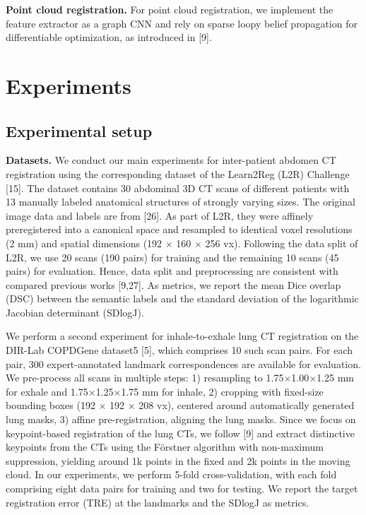 \textbf{Point cloud registration.} For point cloud registration, we implement the feature extractor as a graph CNN and rely on sparse loopy belief propagation for differentiable optimization, as introduced in [9].

\section{Experiments}

\subsection{Experimental setup}

\textbf{Datasets.} We conduct our main experiments for inter-patient abdomen CT registration using the corresponding dataset of the Learn2Reg (L2R) Challenge [15]. The dataset contains 30 abdominal 3D CT scans of different patients with 13 manually labeled anatomical structures of strongly varying sizes. The original image data and labels are from [26]. As part of L2R, they were affinely preregistered into a canonical space and resampled to identical voxel resolutions (2 mm) and spatial dimensions (192 $\times$ 160 $\times$ 256 vx). Following the data split of L2R, we use 20 scans (190 pairs) for training and the remaining 10 scans (45 pairs) for evaluation. Hence, data split and preprocessing are consistent with compared previous works [9,27]. As metrics, we report the mean Dice overlap (DSC) between the semantic labels and the standard deviation of the logarithmic Jacobian determinant (SDlogJ).

We perform a second experiment for inhale-to-exhale lung CT registration on the DIR-Lab COPDGene dataset5 [5], which comprises 10 such scan pairs. For each pair, 300 expert-annotated landmark correspondences are available for evaluation. We pre-process all scans in multiple steps: 1) resampling to 1.75$\times$1.00$\times$1.25 mm for exhale and 1.75$\times$1.25$\times$1.75 mm for inhale, 2) cropping with fixed-size bounding boxes (192 $\times$ 192 $\times$ 208 vx), centered around automatically generated lung masks, 3) affine pre-registration, aligning the lung masks. Since we focus on keypoint-based registration of the lung CTs, we follow [9] and extract distinctive keypoints from the CTs using the Förstner algorithm with non-maximum suppression, yielding around 1k points in the fixed and 2k points in the moving cloud. In our experiments, we perform 5-fold cross-validation, with each fold comprising eight data pairs for training and two for testing. We report the target registration error (TRE) at the landmarks and the SDlogJ as metrics.

